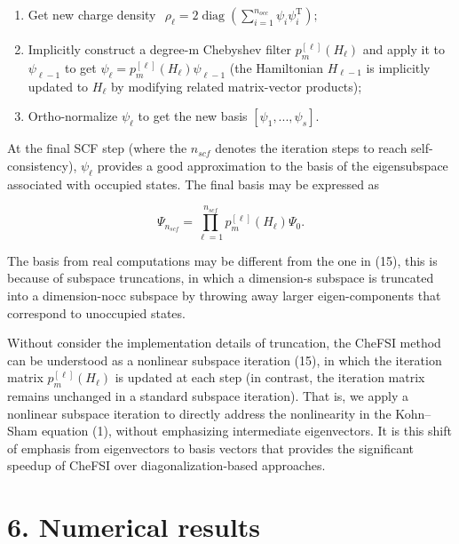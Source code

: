 \documentclass[
  10
]{article}
\begin{document}
\begin{enumerate}
\def\labelenumi{(\roman{enumi})}
\item
  Get new charge density
  \(\begin{array} { r } { \rho _ { \ell } = 2 \operatorname { d i a g } ( \sum _ { i = 1 } ^ { n _ { o c c } } \psi _ { i } \psi _ { i } ^ { \mathrm { { T } } } ) ; } \end{array}\)
\item
  Implicitly construct a degree-m Chebyshev filter
  \(p _ { m } ^ { [ \ell ] } ( H _ { \ell } )\) and apply it to
  \(\psi _ { \ell - 1 }\) to get
  \(\psi _ { \ell } = p _ { m } ^ { [ \ell ] } ( H _ { \ell } ) \psi _ { \ell - 1 }\)
  (the Hamiltonian \(H _ { \ell - 1 }\) is implicitly updated to
  \(H _ { \ell }\) by modifying related matrix-vector products);
\item
  Ortho-normalize \(\psi _ { \ell }\) to get the new basis
  \([ \psi _ { 1 } , . . . , \psi _ { s } ] .\)
\end{enumerate}

At the final SCF step (where the \(n _ { s c f }\) denotes the iteration
steps to reach self-consistency), \(\psi _ { \ell }\) provides a good
approximation to the basis of the eigensubspace associated with occupied
states. The final basis may be expressed as

\[
\Psi_ {n _ {s c f}} = \prod_ {\ell = 1} ^ {n _ {s c f}} p _ {m} ^ {[ \ell ]} (H _ {\ell}) \Psi_ {0}. \tag {15}
\]

The basis from real computations may be different from the one in (15),
this is because of subspace truncations, in which a dimension-s subspace
is truncated into a dimension-nocc subspace by throwing away larger
eigen-components that correspond to unoccupied states.

Without consider the implementation details of truncation, the CheFSI
method can be understood as a nonlinear subspace iteration (15), in
which the iteration matrix \(p _ { m } ^ { [ \ell ] } ( H _ { \ell } )\)
is updated at each step (in contrast, the iteration matrix remains
unchanged in a standard subspace iteration). That is, we apply a
nonlinear subspace iteration to directly address the nonlinearity in the
Kohn--Sham equation (1), without emphasizing intermediate eigenvectors.
It is this shift of emphasis from eigenvectors to basis vectors that
provides the significant speedup of CheFSI over diagonalization-based
approaches.

\section{6. Numerical results}\label{numerical-results}
\end{document}
